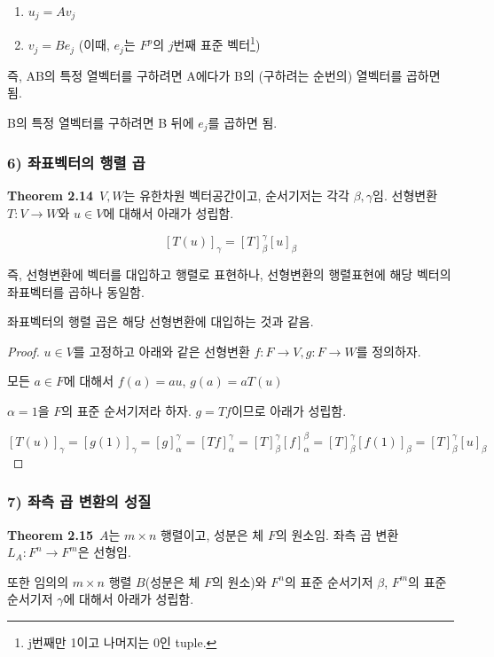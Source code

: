 \documentclass[10pt, a4paper]{article}
\begin{document}
\begin{enumerate}
    \item $u_j=Av_j$
    \item $v_j=Be_j$ (이때, $e_j$는 $F^p$의 $j$번째 표준 벡터\footnote{j번째만 1이고 나머지는 0인 tuple.})
\end{enumerate}

즉, AB의 특정 열벡터를 구하려면 A에다가 B의 (구하려는 순번의) 열벡터를 곱하면 됨.

B의 특정 열벡터를 구하려면 B 뒤에 $e_j$를 곱하면 됨.


\newpage


\subsubsection*{6) 좌표벡터의 행렬 곱}
\textbf{Theorem 2.14}\, $V,W$는 유한차원 벡터공간이고, 순서기저는 각각 $\beta, \gamma$임. 선형변환 $T:V \rightarrow W$와 $u \in V$에 대해서 아래가 성립함.

\[
[T(u)]_{\gamma}=[T]_{\beta}^{\gamma}[u]_{\beta}
\]

즉, 선형변환에 벡터를 대입하고 행렬로 표현하나, 선형변환의 행렬표현에 해당 벡터의 좌표벡터를 곱하나 동일함.

좌표벡터의 행렬 곱은 해당 선형변환에 대입하는 것과 같음.

\begin{proof}
$u \in V$를 고정하고 아래와 같은 선형변환 $f:F \rightarrow V,g:F \rightarrow W$를 정의하자.

\begin{center}
모든 $a \in F$에 대해서 $f(a)=au$, $g(a)=aT(u)$
\end{center}

$\alpha={1}$을 $F$의 표준 순서기저라 하자. $g =Tf$이므로 아래가 성립함.

\[
[T(u)]_{\gamma}=[g(1)]_{\gamma}=[g]_{\alpha}^{\gamma}=[Tf]_{\alpha}^{\gamma}=[T]_{\beta}^{\gamma}[f]_{\alpha}^{\beta}=[T]_{\beta}^{\gamma}[f(1)]_{\beta}=[T]_{\beta}^{\gamma}[u]_{\beta}
\]

\end{proof}

\subsubsection*{7) 좌측 곱 변환의 성질}
\textbf{Theorem 2.15}\, $A$는 $m \times n$ 행렬이고, 성분은 체 $F$의 원소임. 좌측 곱 변환 $L_A:F^n \rightarrow F^m$은 선형임.

또한 임의의 $m \times n$ 행렬 $B$(성분은 체 $F$의 원소)와 $F^n$의 표준 순서기저 $\beta$, $F^m$의 표준 순서기저 $\gamma$에 대해서 아래가 성립함.
\end{document}
